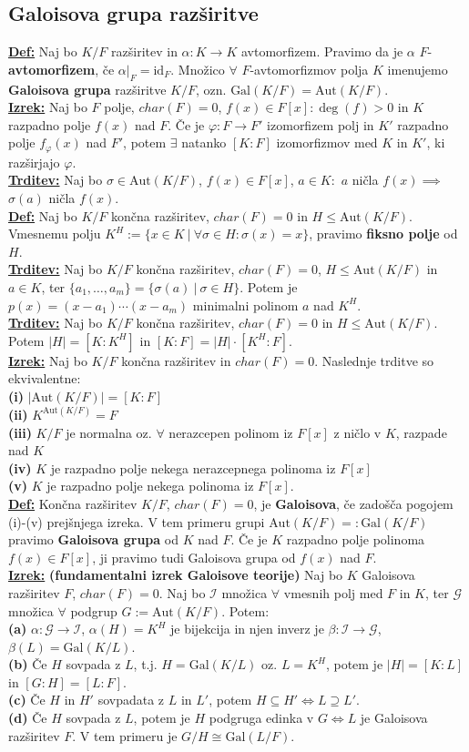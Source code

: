 \documentclass[a4paper,oneside,8pt,landscape]{extarticle}
\renewcommand{\phi}{\varphi}
\let\oldtextbf\textbf
\renewcommand{\textbf}[1]{\oldtextbf{\boldmath #1}}
\newcommand{\definicija}[1]{\textbf{\underline{Def:} }{#1}\\}
\newcommand{\trditev}[1]{\textbf{\underline{Trditev:} }{#1}\\}
\newcommand{\izrek}[1]{\textbf{\underline{Izrek:} }{#1}\\}
\newcommand{\bt}[1]{\textbf{#1}}
\begin{document}
\begin{multicols*}{3}
\subsection*{Galoisova grupa razširitve}
\definicija{Naj bo $K/F$ razširitev in $\alpha : K\to K$ avtomorfizem. Pravimo da je $\alpha$ $F$-\bt{avtomorfizem}, če $\alpha|_F = \text{id}_F$. Množico $\forall$ $F$-avtomorfizmov polja $K$ imenujemo \bt{Galoisova grupa} razširitve $K/F$, ozn. $\text{Gal}(K/F)=\text{Aut}(K/F)$.}
\izrek{Naj bo $F$ polje, $char(F)=0$, $f(x)\in F[x]:\deg(f)>0$ in $K$ razpadno polje $f(x)$ nad $F$. Če je $\phi:F\to F'$ izomorfizem polj in $K'$ razpadno polje $f_{\phi}(x)$ nad $F'$, potem $\exists$ natanko $[K:F]$ izomorfizmov med $K$ in $K'$, ki razširjajo $\phi$.}
\trditev{Naj bo $\sigma \in \text{Aut}(K/F)$, $f(x)\in F[x]$, $a\in K:$ $a$ ničla $f(x) \implies $ $\sigma(a)$ ničla $f(x)$.}
\definicija{Naj bo $K/F$ končna razširitev, $char(F)=0$ in $H\leq \text{Aut}(K/F)$. Vmesnemu polju $K^H := \{x\in K\ | \ \forall\sigma\in H :\sigma(x)=x\}$, pravimo \bt{fiksno polje} od $H$.}
\trditev{Naj bo $K/F$ končna razširitev, $char(F)=0$, $H\leq \text{Aut}(K/F)$ in $a\in K$, ter $\{a_1,\dots, a_m\} = \{\sigma(a)\ | \ \sigma\in H\}$. Potem je $p(x) = (x-a_1)\cdots (x-a_m)$ minimalni polinom $a$ nad $K^H$.}
\trditev{Naj bo $K/F$ končna razširitev, $char(F)=0$ in $H\leq \text{Aut}(K/F)$. Potem $|H| = [K:K^H]$ in $[K:F] = |H|\cdot [K^H:F]$.}
\izrek{Naj bo $K/F$ končna razširitev in $char(F)=0$. Naslednje trditve so ekvivalentne: \\
\bt{(i)} $|\text{Aut}(K/F)|=[K:F]$ \\
\bt{(ii)} $K^{\text{Aut}(K/F)} = F$ \\
\bt{(iii)} $K/F$ je normalna oz. $\forall$ nerazcepen polinom iz $F[x]$ z ničlo v $K$, razpade nad $K$ \\
\bt{(iv)} $K$ je razpadno polje nekega nerazcepnega polinoma iz $F[x]$ \\
\bt{(v)} $K$ je razpadno polje nekega polinoma iz $F[x]$.}
\definicija{Končna razširitev $K/F$, $char(F)=0$, je \bt{Galoisova}, če zadošča pogojem (i)-(v) prejšnjega izreka. V tem primeru grupi $\text{Aut}(K/F)=:\text{Gal}(K/F)$ pravimo \bt{Galoisova grupa} od $K$ nad $F$. Če je $K$ razpadno polje polinoma $f(x)\in F[x]$, ji pravimo tudi Galoisova grupa od $f(x)$ nad $F$.}
\izrek{\bt{(fundamentalni izrek Galoisove teorije)} Naj bo $K$ Galoisova razširitev $F$, $char(F)=0$. Naj bo $\mathcal{I}$ množica $\forall$ vmesnih polj med $F$ in $K$, ter $\mathcal{G}$ množica $\forall$ podgrup $G:= \text{Aut}(K/F)$. Potem: \\
\bt{(a)} $\alpha:\mathcal{G}\to \mathcal{I}$, $\alpha(H)=K^H$ je bijekcija in njen inverz je $\beta:\mathcal{I}\to \mathcal{G}$, $\beta(L)=\text{Gal}(K/L)$. \\
\bt{(b)} Če $H$ sovpada z $L$, t.j. $H=\text{Gal}(K/L)$ oz. $L=K^H$, potem je $|H|=[K:L]$ in $[G:H]=[L:F]$. \\
\bt{(c)} Če $H$ in $H'$ sovpadata z $L$ in $L'$, potem $H\subseteq H'\iff L \supseteq L'$. \\
\bt{(d)} Če $H$ sovpada z $L$, potem je $H$ podgruga edinka v $G \iff L$ je Galoisova razširitev $F$. V tem primeru je $G/H \cong \text{Gal}(L/F)$. }
\vspace{-15pt}

\end{multicols*}
\end{document}
